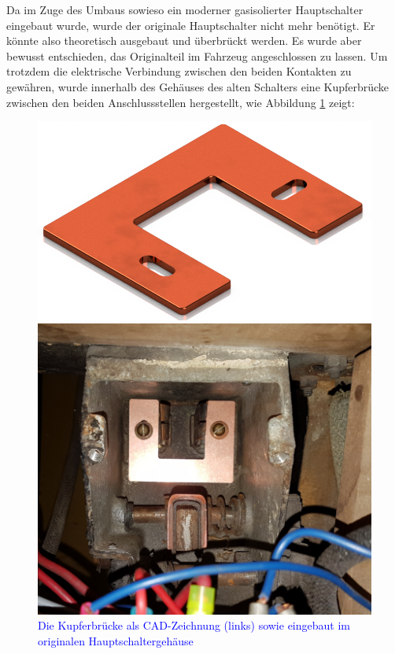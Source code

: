 {Da im Zuge des Umbaus sowieso ein moderner gasisolierter Hauptschalter eingebaut wurde, wurde der originale Hauptschalter nicht mehr benötigt. Er könnte also theoretisch ausgebaut und überbrückt werden. Es wurde aber bewusst entschieden, das Originalteil im Fahrzeug angeschlossen zu lassen. Um trotzdem die elektrische Verbindung zwischen den beiden Kontakten zu gewähren, wurde innerhalb des Gehäuses des alten Schalters eine Kupferbrücke zwischen den beiden Anschlussstellen hergestellt, wie Abbildung \ref{fig:Bruecke_HS} zeigt:

\begin{figure}[h!]
\begin{minipage}{0.49\textwidth}
\includegraphics[width=\textwidth]{images/Bruecke_HS.png}
\end{minipage}\begin{minipage}{0.49\textwidth}
\includegraphics[width=\textwidth]{images/U-Profil.png}
\end{minipage}
\caption{\textcolor{blue}{Die Kupferbrücke als CAD-Zeichnung (links) sowie eingebaut im originalen Hauptschaltergehäuse}}%
\label{fig:Bruecke_HS}%
\end{figure}

}
